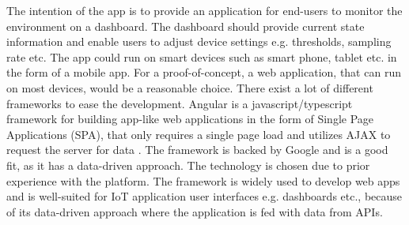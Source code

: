 The intention of the app is to provide an application for end-users to monitor the environment on a dashboard. The dashboard should provide current state information and enable users to adjust device settings e.g. thresholds, sampling rate etc. The app could run on smart devices such as smart phone, tablet etc. in the form of a mobile app. For a proof-of-concept, a web application, that can run on most devices, would be a reasonable choice. There exist a lot of different frameworks to ease the development.  Angular \cite{angular} is a javascript/typescript framework for building app-like web applications in the form of Single Page Applications (SPA), that only requires a single page load and utilizes AJAX to request the server for data \cite{flanagan_2007}. The framework is backed by Google and is a good fit, as it has a data-driven approach. The technology is chosen due to prior experience with the platform. The framework is widely used to develop web apps and is well-suited for IoT application user interfaces e.g. dashboards etc., because of its data-driven approach where the application is fed with data from APIs.